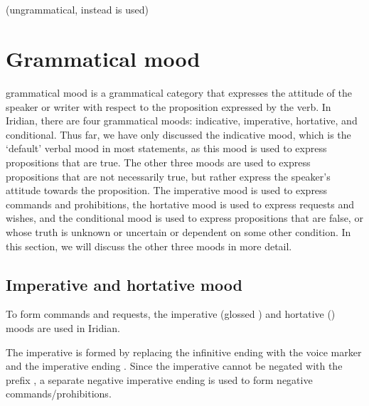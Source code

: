 \pex
\a {}\\
   \\
\a {}\\
   \\
    (ungrammatical, instead  is used)
\xe


\section{Grammatical mood}\label{sec:mood}

{\sc grammatical mood} is a grammatical category that expresses the attitude of
the speaker or writer with respect to the proposition expressed by the verb. In
Iridian, there are four grammatical moods: indicative,
imperative, hortative, and
conditional. Thus far, we have only discussed the
indicative mood, which is the `default' verbal mood in most statements, as this
mood is used to express propositions that are true. The other three moods are
used to express propositions that are not necessarily true, but rather express
the speaker's attitude towards the proposition. The imperative mood is used to
express commands and prohibitions, the hortative mood is used to express
requests and wishes, and the conditional mood is used to express propositions
that are false, or whose truth is unknown or uncertain or dependent on some
other condition. In this section, we will discuss the other three moods in more
detail.


\subsection{Imperative and hortative mood}\label{sec:imp-hort}

To form commands and requests, the imperative
(glossed \Imp{}) and hortative () moods are used in Iridian.

The imperative is formed by replacing the infinitive ending  with the
voice marker and the imperative ending . Since the
imperative cannot be negated with the prefix ,
a separate negative imperative ending  is used to form negative
commands/prohibitions.

